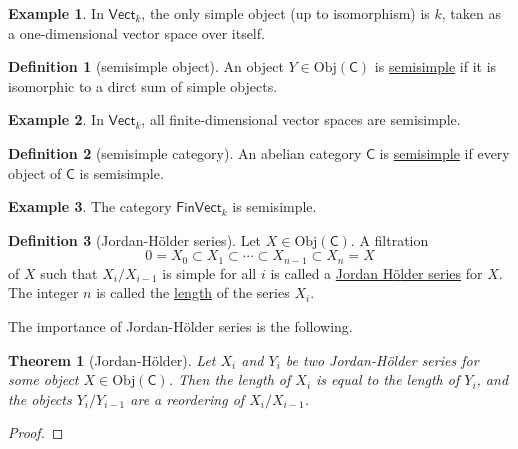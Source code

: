 \documentclass[a4paper]{report}
\newcommand{\defn}[1]{\ul{#1}}
\newcommand{\Obj}{\mathrm{Obj}}
\theoremstyle{definition}
\newtheorem{definition}{Definition}[section]
\newtheorem{example}{Example}[section]
\theoremstyle{plain}
\newtheorem{theorem}{Theorem}[section]
\theoremstyle{remark}
\begin{document}
\begin{example}
  In $\mathsf{Vect}_{k}$, the only simple object (up to isomorphism) is $k$, taken as a one-dimensional vector space over itself.
\end{example}

\begin{definition}[semisimple object]
  \label{def:semisimpleobject}
  An object $Y \in \Obj(\mathsf{C})$ is \defn{semisimple} if it is isomorphic to a dirct sum of simple objects.
\end{definition}

\begin{example}
  In $\mathsf{Vect}_{k}$, all finite-dimensional vector spaces are semisimple.
\end{example}

\begin{definition}[semisimple category]
  \label{def:semisimple category}
  An abelian category $\mathsf{C}$ is \defn{semisimple} if every object of $\mathsf{C}$ is semisimple.
\end{definition}

\begin{example}
  The category $\mathsf{FinVect}_{k}$ is semisimple.
\end{example}

\begin{definition}[Jordan-H{\"o}lder series]
  \label{def:jordanholderseries}
  Let $X \in \Obj(\mathsf{C})$. A filtration 
  \begin{equation*}
    0 = X_{0} \subset X_{1} \subset \cdots \subset X_{n-1} \subset X_{n} = X
  \end{equation*}
  of $X$ such that $X_{i} / X_{i-1}$ is simple for all $i$ is called a \defn{Jordan H{\"o}lder series} for $X$. The integer $n$ is called the \defn{length} of the series $X_{i}$.
\end{definition}

The importance of Jordan-H{\"o}lder series is the following.

\begin{theorem}[Jordan-H{\"o}lder]
  \label{thm:jordanholdertheorem}
  Let $X_{i}$ and $Y_{i}$ be two Jordan-H{\"o}lder series for some object $X \in \Obj(\mathsf{C})$. Then the length of $X_{i}$ is equal to the length of $Y_{i}$, and the objects $Y_{i}/Y_{i-1}$ are a reordering of $X_{i}/X_{i-1}$.
\end{theorem}
\begin{proof}

\end{proof}
\end{document}
